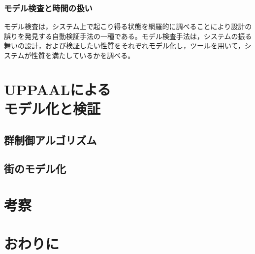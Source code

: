 \documentclass{tpu-sotu}
\begin{document}
	\subsection{モデル検査と時間の扱い}
	モデル検査は，システム上で起こり得る状態を網羅的に調べることにより設計の誤りを発見する自動検証手法の一種である。モデル検査手法は，システムの振る舞いの設計，および検証したい性質をそれぞれモデル化し，ツールを用いて，システムが性質を満たしているかを調べる。
\chapter{UPPAALによる\\モデル化と検証}
	\section{群制御アルゴリズム}
	\section{街のモデル化}
\chapter{考察}
\chapter{おわりに}
\acknowledgements
\begin{thebibliography}{1}
\end{thebibliography}
\end{document}
